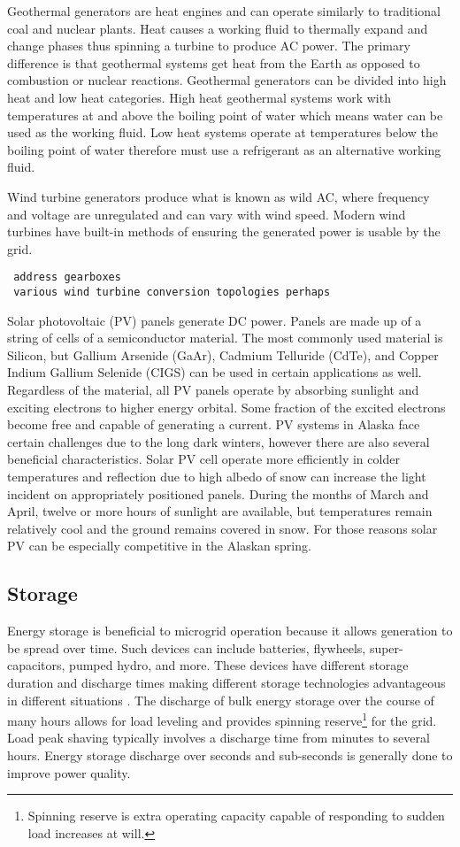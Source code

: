 Geothermal generators are heat engines and can operate similarly to traditional coal and nuclear plants. Heat causes a working fluid to thermally expand and change phases thus spinning a turbine to produce AC power. The primary difference is that geothermal systems get heat from the Earth as opposed to combustion or nuclear reactions. Geothermal generators can be divided into high heat and low heat categories. High heat geothermal systems work with temperatures at and above the boiling point of water which means water can be used as the working fluid. Low heat systems operate at temperatures below the boiling point of water therefore must use a refrigerant as an alternative working fluid. 

Wind turbine generators produce what is known as wild AC, where frequency and voltage are unregulated and can vary with wind speed. Modern wind turbines have built-in methods of ensuring the generated power is usable by the grid.
\begin{verbatim} 
 address gearboxes  
 various wind turbine conversion topologies perhaps
\end{verbatim}

Solar photovoltaic (PV) panels generate DC power. Panels are made up of a string of cells of a semiconductor material. The most commonly used material is Silicon, but Gallium Arsenide (GaAr), Cadmium Telluride (CdTe), and Copper Indium Gallium Selenide (CIGS) can be used in certain applications as well. Regardless of the material, all PV panels operate by absorbing sunlight and exciting electrons to higher energy orbital. Some fraction of the excited electrons become free and capable of generating a current. PV systems in Alaska face certain challenges due to the long dark winters, however there are also several beneficial characteristics. Solar PV cell operate more efficiently in colder temperatures and reflection due to high albedo of snow can increase the light incident on appropriately positioned panels. During the months of March and April, twelve or more hours of sunlight are available, but temperatures remain relatively cool and the ground remains covered in snow. For those reasons solar PV can be especially competitive in the Alaskan spring.

\subsection{Storage}
Energy storage is beneficial to microgrid operation because it allows generation to be spread over time. Such devices can include batteries, flywheels, super-capacitors, pumped hydro, and more. These devices have different storage duration and discharge times making different storage technologies advantageous in different situations \cite{Schoenung2003}. The discharge of bulk energy storage over the course of many hours allows for load leveling and provides spinning reserve\footnote{Spinning reserve is extra operating capacity capable of responding to sudden load increases at will.} for the grid. Load peak shaving typically involves a discharge time from minutes to several hours. Energy storage discharge over seconds and sub-seconds is generally done to improve power quality.

